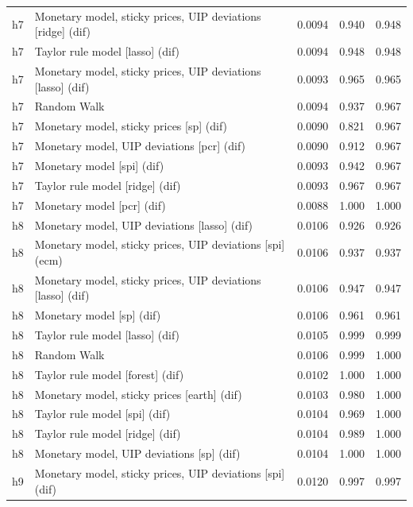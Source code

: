 \begin{ThreePartTable}
\begin{longtable}[t]{cp{5.5cm}ccc}
h7 & \raggedright Monetary model, sticky prices, UIP deviations [ridge] (dif) & 0.0094 & 0.940 & 0.948\\
h7 & \raggedright Taylor rule model [lasso] (dif) & 0.0094 & 0.948 & 0.948\\
h7 & \raggedright Monetary model, sticky prices, UIP deviations [lasso] (dif) & 0.0093 & 0.965 & 0.965\\
h7 & \raggedright Random Walk & 0.0094 & 0.937 & 0.967\\
h7 & \raggedright Monetary model, sticky prices [sp] (dif) & 0.0090 & 0.821 & 0.967\\
h7 & \raggedright Monetary model, UIP deviations [pcr] (dif) & 0.0090 & 0.912 & 0.967\\
h7 & \raggedright Monetary model [spi] (dif) & 0.0093 & 0.942 & 0.967\\
h7 & \raggedright Taylor rule model [ridge] (dif) & 0.0093 & 0.967 & 0.967\\
h7 & \raggedright Monetary model [pcr] (dif) & 0.0088 & 1.000 & 1.000\\
\addlinespace
h8 & \raggedright Monetary model, UIP deviations [lasso] (dif) & 0.0106 & 0.926 & 0.926\\
h8 & \raggedright Monetary model, sticky prices, UIP deviations [spi] (ecm) & 0.0106 & 0.937 & 0.937\\
h8 & \raggedright Monetary model, sticky prices, UIP deviations [lasso] (dif) & 0.0106 & 0.947 & 0.947\\
h8 & \raggedright Monetary model [sp] (dif) & 0.0106 & 0.961 & 0.961\\
h8 & \raggedright Taylor rule model [lasso] (dif) & 0.0105 & 0.999 & 0.999\\
h8 & \raggedright Random Walk & 0.0106 & 0.999 & 1.000\\
h8 & \raggedright Taylor rule model [forest] (dif) & 0.0102 & 1.000 & 1.000\\
h8 & \raggedright Monetary model, sticky prices [earth] (dif) & 0.0103 & 0.980 & 1.000\\
h8 & \raggedright Taylor rule model [spi] (dif) & 0.0104 & 0.969 & 1.000\\
h8 & \raggedright Taylor rule model [ridge] (dif) & 0.0104 & 0.989 & 1.000\\
h8 & \raggedright Monetary model, UIP deviations [sp] (dif) & 0.0104 & 1.000 & 1.000\\
\addlinespace
h9 & \raggedright Monetary model, sticky prices, UIP deviations [spi] (dif) & 0.0120 & 0.997 & 0.997\\

\end{longtable}
\end{ThreePartTable}
